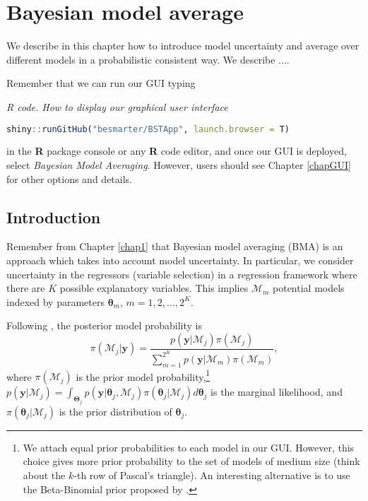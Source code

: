 \chapter{Bayesian model average}\label{chap10}

We describe in this chapter how to introduce model uncertainty and average over different models in a probabilistic consistent way. We describe .... 

Remember that we can run our GUI typing

\begin{tcolorbox}[enhanced,width=4.67in,center upper,
	fontupper=\large\bfseries,drop shadow southwest,sharp corners]
	\textit{R code. How to display our graphical user interface}
	\begin{VF}
		\begin{lstlisting}[language=R]
	shiny::runGitHub("besmarter/BSTApp", launch.browser = T)\end{lstlisting}
	\end{VF}
\end{tcolorbox} 

in the \textbf{R} package console or any \textbf{R} code editor, and once our GUI is deployed, select \textit{Bayesian Model Averaging}. However, users should see Chapter \ref{chapGUI} for other options and details.

\section{Introduction}\label{sec101}
Remember from Chapter \ref{chap1} that Bayesian model averaging (BMA) is an approach which takes into account model uncertainty. In particular, we consider uncertainty in the regressors (variable selection) in a regression framework where there are $K$ possible explanatory variables. This implies $\mathcal{M}_m$ potential models indexed by parameters $\bm{\theta}_m$, $m=1,2,\dots,2^K$.

Following \cite{Simmons2010}, the posterior model probability is
\begin{equation*}
	\pi(\mathcal{M}_j |\bm{y})=\frac{p(\bm{y} | \mathcal{M}_j)\pi(\mathcal{M}_j)}{\sum_{m=1}^{2^K}p(\bm{y} | \mathcal{M}_m)\pi(\mathcal{M}_m)},
\end{equation*}
where $\pi(\mathcal{M}_j)$ is the prior model probability,\footnote{We attach equal prior probabilities to each model in our GUI. However, this choice gives more prior probability to the set of models of medium size (think about the $k$-th row of Pascal's triangle). An interesting alternative is to use the Beta-Binomial prior proposed by \cite{ley2009effect}.} $p(\bm{y} | \mathcal{M}_j)=\int_{\bm{\Theta}_j} p(\bm{y}| \bm{\theta}_j,\mathcal{M}_j)\pi(\bm{\theta}_j | \mathcal{M}_j) d\bm{\theta}_{j}$ is the marginal likelihood, and $\pi(\bm{\theta}_j | \mathcal{M}_j)$ is the prior distribution of $\bm{\theta}_j$.

